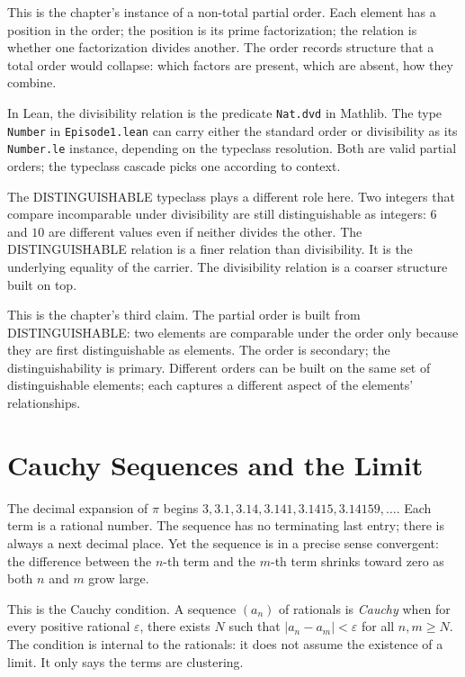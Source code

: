 This is the chapter's instance of a non-total partial order. Each
element has a position in the order; the position is its prime
factorization; the relation is whether one factorization divides
another. The order records structure that a total order would
collapse: which factors are present, which are absent, how they
combine.

In Lean, the divisibility relation is the predicate \texttt{Nat.dvd}
in Mathlib. The type \texttt{Number} in \texttt{Episode1.lean} can
carry either the standard order or divisibility as its
\texttt{Number.le} instance, depending on the typeclass resolution.
Both are valid partial orders; the typeclass cascade picks one
according to context.

The DISTINGUISHABLE typeclass plays a different role here. Two integers
that compare incomparable under divisibility are still distinguishable as
integers: $6$ and $10$ are different values even if neither divides the
other. The DISTINGUISHABLE relation is a finer relation than divisibility.
It is the underlying equality of the carrier. The divisibility relation
is a coarser structure built on top.

This is the chapter's third claim. The partial order is built from
DISTINGUISHABLE: two elements are comparable under the order only
because they are first distinguishable as elements. The order is
secondary; the distinguishability is primary. Different orders can be
built on the same set of distinguishable elements; each captures a
different aspect of the elements' relationships.

\section{Cauchy Sequences and the Limit}
\label{se:cauchy-sequences-and-the-limit}

The decimal expansion of $\pi$ begins $3, 3.1, 3.14, 3.141, 3.1415,
3.14159, \ldots$. Each term is a rational number. The sequence has no
terminating last entry; there is always a next decimal place. Yet the
sequence is in a precise sense convergent: the difference between the
$n$-th term and the $m$-th term shrinks toward zero as both $n$ and $m$
grow large.

This is the Cauchy condition. A sequence $(a_n)$ of rationals is
\emph{Cauchy} when for every positive rational $\varepsilon$, there
exists $N$ such that $|a_n - a_m| < \varepsilon$ for all $n, m \ge N$.
The condition is internal to the rationals: it does not assume the
existence of a limit. It only says the terms are clustering.

